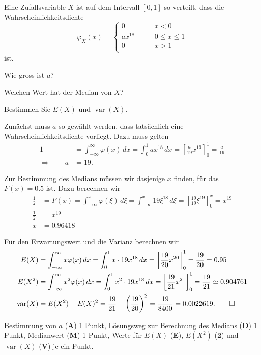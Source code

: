 Eine Zufallsvariable $X$ ist auf dem Intervall $[0,1]$ so verteilt, dass die
Wahrscheinlichkeitsdichte
\[
\varphi_X(x)=\begin{cases}
0&\qquad x < 0\\
ax^{18}&\qquad 0\le x \le 1\\
0&\qquad x > 1\\
\end{cases}
\]
ist.
\begin{teilaufgaben}
\item Wie gross ist $a$?
\item Welchen Wert hat der Median von $X$?
\item Bestimmen Sie $E(X)$ und $\operatorname{var}(X)$.
\end{teilaufgaben}

\begin{loesung}
\begin{teilaufgaben}
\item
Zunächst muss $a$ so gewählt werden, dass tatsächlich eine
Wahrscheinlichkeitsdichte vorliegt. Dazu muss gelten
\begin{align*}
1
&=
\int_{-\infty}^{\infty} \varphi(x)\,dx
=
\int_0^1 ax^{18}\,dx
=
\left[
\frac{a}{19}x^{19}
\right]_0^1
=\frac{a}{19}
\\
\Rightarrow \qquad a&= 19.
\end{align*}
\item
Zur Bestimmung des Medians müssen wir dasjenige $x$ finden, für das 
$F(x)=0.5$ ist. Dazu berechnen wir
\begin{align*}
\frac12
&=
F(x)
=
\int_{-\infty}^x \varphi(\xi)\,d\xi
=
\int_{-\infty}^x 19\xi^{18}\,d\xi
=
\left[
\frac{19}{19}\xi^{19}
\right]_0^x
=x^{19}
\\
\frac12&=x^{19}\\
x&=0.96418
\end{align*}
\item
Für den Erwartungswert und die Varianz berechnen wir
\begin{align*}
E(X)
&=
\int_{-\infty}^\infty x\varphi(x)\,dx
=
\int_0^1x\cdot 19x^{18}\,dx
=
\left[
\frac{19}{20}x^{20}
\right]_0^1
=\frac{19}{20}=0.95
\\
E(X^2)
&=
\int_{-\infty}^\infty x^2\varphi(x)\,dx
=
\int_0^1x^2\cdot 19x^{18}\,dx
=
\left[
\frac{19}{21}x^{21}
\right]_0^1
=\frac{19}{21}
\simeq 0.904761
\\
\operatorname{var}(X)
&=
E(X^2)-E(X)^2
=
\frac{19}{21}-\biggl(\frac{19}{20}\biggr)^2
=
\frac{19}{8400}=0.0022619.
\qedhere
\end{align*}
\end{teilaufgaben}
\end{loesung}

\begin{bewertung}
Bestimmung von $a$ ({\bf A}) 1 Punkt,
Lösungsweg zur Berechnung des Medians ({\bf D}) 1 Punkt,
Medianwert ({\bf M}) 1 Punkt,
Werte für $E(X)$ ({\bf E}),
$E(X^2)$  ({\bf 2}) und $\operatorname{var}(X)$ ({\bf V}) je ein Punkt.
\end{bewertung}

